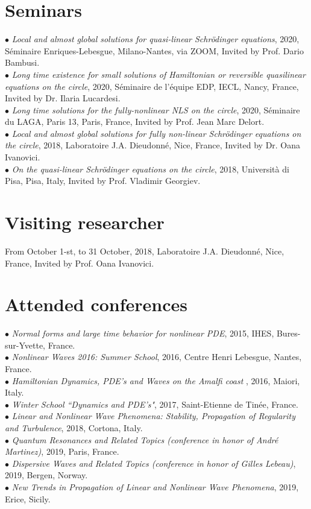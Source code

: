 \documentclass[margin,line,pifont,palatino,courier]{res}
\begin{document}
\begin{resume}
\section{\sc Seminars}
$\bullet$ \emph{Local and almost global solutions for quasi-linear Schr\"odinger equations}, 2020, S\'eminaire Enriques-Lebesgue, Milano-Nantes, via ZOOM, Invited by Prof. Dario Bambusi. \\
$\bullet$ \emph{Long time existence for small solutions of Hamiltonian or reversible quasilinear equations on the circle}, 2020, S\'eminaire de l'\'equipe EDP, IECL, Nancy, France, Invited by Dr. Ilaria Lucardesi.\\
$\bullet$ \emph{Long time solutions for the fully-nonlinear NLS on the circle}, 2020, S\'eminaire du LAGA,  Paris 13, Paris, France, Invited by  Prof. Jean Marc Delort.\\
$\bullet$ \emph{Local and almost global solutions for fully non-linear Schr\"odinger equations on the circle}, 2018, Laboratoire  J.A. Dieudonn\'e, Nice, France,  Invited by Dr. Oana Ivanovici.\\
$\bullet$ \emph{On the quasi-linear Schr\"odinger equations on the circle}, 2018, Universit\`a di Pisa, Pisa, Italy,  Invited by Prof. Vladimir Georgiev.\\

\section{\sc Visiting researcher}

From October 1-st, to 31 October, 2018, Laboratoire  J.A. Dieudonn\'e, Nice, France,  Invited by Prof. Oana Ivanovici.

\section{\sc Attended conferences \\}
 $\bullet$ \emph{Normal forms and large time behavior for nonlinear PDE}, 2015, IHES, Bures-sur-Yvette, France.  \\
 $\bullet$  \emph{Nonlinear Waves 2016: Summer School}, 2016, Centre Henri Lebesgue, Nantes, France.  \\
$\bullet$ \emph{Hamiltonian Dynamics, PDE's and Waves on the Amalfi coast
}, 2016, Maiori, Italy. \\
$\bullet$ \emph{Winter School ``Dynamics and PDE's"}, 2017, Saint-Etienne de Tin\'ee, France. \\
$\bullet$ \emph{Linear and Nonlinear Wave Phenomena: Stability, Propagation of Regularity and Turbulence}, 2018, Cortona, Italy.\\
$\bullet$ \emph{Quantum Resonances and Related Topics (conference in honor of Andr\'e Martinez)}, 2019, Paris, France. \\
$\bullet$ \emph{Dispersive Waves and Related Topics (conference in honor of Gilles Lebeau)}, 2019, Bergen, Norway.\\
$\bullet$ \emph{New Trends in Propagation of Linear and Nonlinear Wave Phenomena}, 2019, Erice, Sicily. \\


\end{resume}
\end{document}
